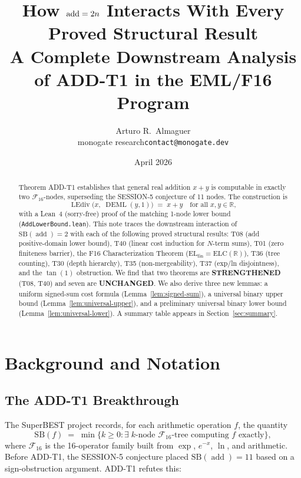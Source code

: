 \documentclass[12pt,a4paper]{article}
\title{How $\addop = 2n$ Interacts With Every Proved Structural Result\\[4pt]
       \large A Complete Downstream Analysis of ADD-T1 in the EML/F16 Program}
\author{Arturo R.\ Almaguer\\
  \small monogate research\quad\texttt{contact@monogate.dev}}
\date{April 2026}
\theoremstyle{definition}
\newcommand{\DEML}{\operatorname{DEML}}
\newcommand{\LEdiv}{\operatorname{LEdiv}}
\newcommand{\addop}{\operatorname{add}}
\newcommand{\SB}{\mathrm{SB}}
\newcommand{\F}{\mathcal{F}_{16}}
\newcommand{\ELC}{\mathrm{ELC}(\mathbb{R})}
\newcommand{\ELfin}{\mathrm{EL}_{\mathrm{fin}}}
\newcommand{\R}{\mathbb{R}}
\newcommand{\Strengthened}{\textcolor{strengthened}{\textbf{STRENGTHENED}}}
\newcommand{\Unchanged}{\textcolor{unchanged}{\textbf{UNCHANGED}}}
\begin{document}
\maketitle

\begin{abstract}
Theorem ADD-T1 establishes that general real addition $x+y$ is computable
in exactly two $\mathcal{F}_{16}$-nodes, superseding the SESSION-5 conjecture
of 11 nodes.  The construction is
\[
  \LEdiv\!\bigl(x,\;\DEML(y,1)\bigr) \;=\; x + y
  \quad\text{for all }x,y\in\R,
\]
with a Lean~4 (sorry-free) proof of the matching 1-node lower bound
(\texttt{AddLowerBound.lean}).  This note traces the downstream interaction
of $\SB(\addop)=2$ with each of the following proved structural results:
T08 (add positive-domain lower bound),
T40 (linear cost induction for $N$-term sums),
T01 (zero finiteness barrier),
the F16 Characterization Theorem ($\ELfin = \ELC$),
T36 (tree counting),
T30 (depth hierarchy),
T35 (non-mergeability),
T37 (exp/ln disjointness), and
the $\tan(1)$ obstruction.
We find that two theorems are \Strengthened{} (T08, T40) and seven are
\Unchanged{}.  We also derive three new lemmas: a uniform signed-sum cost
formula (Lemma~\ref{lem:signed-sum}), a universal binary upper bound
(Lemma~\ref{lem:universal-upper}), and a preliminary universal binary lower
bound (Lemma~\ref{lem:universal-lower}).
A summary table appears in Section~\ref{sec:summary}.
\end{abstract}

\tableofcontents
\bigskip

\section{Background and Notation}
\label{sec:background}

\subsection{The ADD-T1 Breakthrough}

The SuperBEST project records, for each arithmetic operation $f$, the quantity
\[
  \SB(f) \;=\; \min\bigl\{k\ge 0 : \exists\;\text{$k$-node $\F$-tree computing $f$ exactly}\bigr\},
\]
where $\F$ is the 16-operator family built from $\exp$, $e^{-x}$, $\ln$, and
arithmetic.  Before ADD-T1, the SESSION-5 conjecture placed $\SB(\addop) = 11$
based on a sign-obstruction argument.  ADD-T1 refutes this:
\end{document}
